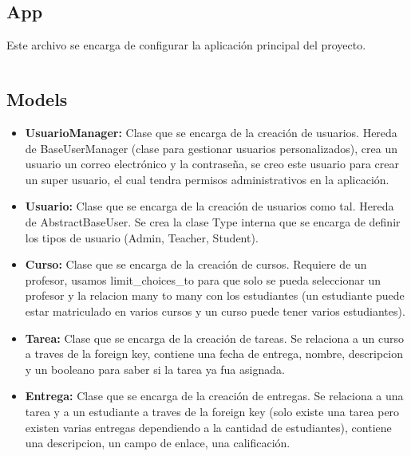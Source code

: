 \documentclass{article}
\begin{document}
\subsection{App}
Este archivo se encarga de configurar la aplicación principal del proyecto.
\inputminted{python3}{../backend/system/apps.py}
\subsection{Models}
\begin{itemize}
	\item \textbf{UsuarioManager:} Clase que se encarga de la creación de usuarios. Hereda de BaseUserManager (clase para gestionar usuarios personalizados), crea un usuario un correo electrónico y la contraseña, se creo este usuario para crear un super usuario, el cual tendra permisos administrativos en la aplicación.
	\item \textbf{Usuario:} Clase que se encarga de la creación de usuarios como tal. Hereda de AbstractBaseUser. Se crea la clase Type interna que se encarga de definir los tipos de usuario (Admin, Teacher, Student).
	\item \textbf{Curso:} Clase que se encarga de la creación de cursos. Requiere de un profesor, usamos limit\_choices\_to para que solo se pueda seleccionar un profesor y la relacion many to many con los estudiantes (un estudiante puede estar matriculado en varios cursos y un curso puede tener varios estudiantes).
	\item \textbf{Tarea:} Clase que se encarga de la creación de tareas. Se relaciona a un curso a traves de la foreign key, contiene una fecha de entrega, nombre, descripcion y un booleano para saber si la tarea ya fua asignada.
	\item \textbf{Entrega:} Clase que se encarga de la creación de entregas. Se relaciona a una tarea y a un estudiante a traves de la foreign key (solo existe una tarea pero existen varias entregas dependiendo a la cantidad de estudiantes), contiene una descripcion, un campo de enlace, una calificación.
\end{itemize}
\inputminted{python3}{../backend/system/models.py}
\end{document}
